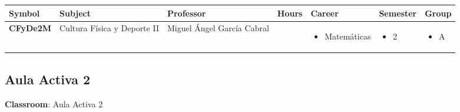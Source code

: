 \documentclass{article}
\begin{document}
        
        \begin{tabular}{|>{\centering\arraybackslash}m{2cm}|>{\centering\arraybackslash}m{4cm}|>{\centering\arraybackslash}m{2.15cm}|>{\centering\arraybackslash}m{1.8cm}|>{\centering\arraybackslash}m{2cm}|>{\centering\arraybackslash}m{2cm}|>{\centering\arraybackslash}m{2cm}|}
        \hline
        \textbf{Symbol} & \textbf{Subject} & \textbf{Professor} & \textbf{Hours} & \textbf{Career} & \textbf{Semester} & \textbf{Group} \\
        \hline
        
            \hline
            \cellcolor[rgb]{0.1803921568627451,0.8313725490196079,0.30196078431372547} \textbf{CFyDe2M} & Cultura F\'isica y Deporte II & Miguel \'Angel Garc\'ia Cabral & 2.0 & \begin{itemize}[left=0pt,align=left]\item Matem\'aticas 
\end{itemize} & \begin{itemize}[left=0pt,align=left]\item 2 
\end{itemize} & \begin{itemize}[left=0pt,align=left]\item A 
\end{itemize}  \\
            \hline
            \end{tabular}
                    

        \newpage
        

        \subsection{Aula Activa 2}
        \vspace*{.1cm}
        
        \begin{flushright}
            {\LARGE \textbf{Classroom}: Aula Activa 2}
        \end{flushright}
        \vspace{1cm}
\end{document}
